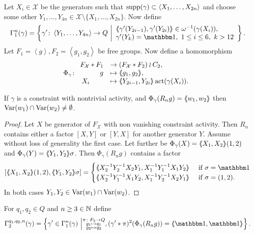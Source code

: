 \documentclass[a4paper,11pt]{amsart}
\begin{document}
Let $X_i\in\mathcal{X}$ be the generators such that
$\operatorname{{supp}}(\gamma) \subset \left<X_1,\dotsc,X_{2n}\right>$ and choose some
other
$Y_1,\dotsc,Y_{4n} \in\mathcal{X} \setminus \{X_1,\dotsc,X_{2n}\}$.
Now define
\[\Gamma_1^n(\gamma) = \left \{\gamma' 
    \colon \left< Y_1,\ldots ,Y_{4n}\right> \to Q \bigmid
    \begin{array}{l}
      \pair{\gamma'(Y_{2i-1}),\gamma'(Y_{2i})}\in \omega^{-1}(\gamma(X_i)),\ \\
      \gamma'(Y_k) = \id,\ 1\leq i\leq 6,\ k>12
    \end{array} \right\}.\]
Let $F_1=\left<g\right>,F_2=\left<g_1,g_2\right>$ be free groups. 
Now define a homomorphism  
\[\Phi_{\gamma}\colon\begin{array}{rl} F_{\mathcal{X}}*F_1 &\to (F_{\mathcal{X}}*F_2)\wr C_2,\\ g&\mapsto \langle\negthickspace\langle g_1,g_2\rangle\negthickspace\rangle,\\ X_i\qquad &\mapsto \langle\negthickspace\langle Y_{2i-1},Y_{2i}\rangle\negthickspace\rangle\operatorname{act}(\gamma(X_i)).\end{array}\]
\begin{lem}\label{lem:commonVar}
  If $\gamma$ is a constraint with nontrivial activity, and
  $\Phi_\gamma(R_ng)=\langle\negthickspace\langle w_1,w_2\rangle\negthickspace\rangle$ then
  $\textup{Var}(w_1)\cap\textup{Var}(w_2)\neq \emptyset$.
\end{lem}
\begin{proof}
  Let $X$ be generator of $F_{\mathcal{X}}$ with non vanishing
  constraint activity.  Then $R_n$ contains either a factor $[X,Y]$ or
  $[Y,X]$ for another generator $Y$.  Assume without loss of
  generality the first case. Let further be
  $\Phi_\gamma(X)=\langle\negthickspace\langle X_1,X_2\rangle\negthickspace\rangle(1,2)$ and
  $\Phi_\gamma(Y)=\langle\negthickspace\langle Y_1,Y_2\rangle\negthickspace\rangle\sigma$.  Then $\Phi_\gamma(R_n g)$
  contains a factor
  \[ [\pair{X_1,X_2}(1,2),\pair{Y_1,Y_2}\sigma] = \begin{cases}
      \pair{X_2^{-1}Y_2^{-1}X_2Y_1,X_1^{-1}Y_1^{-1}X_1Y_2} & \textup{ if } \sigma=\id \\
      \pair{X_2^{-1}Y_1^{-1}X_1Y_2,X_1^{-1}Y_2^{-1}X_2Y_1} & \textup{ if } \sigma=(1,2) . \\
    \end{cases}
  \]
  In both cases $Y_1,Y_2\in \textup{Var}(w_1)\cap \textup{Var}(w_2)$.
\end{proof}
For $q_1,q_2 \in Q$ and $n\geq3\in \mathbb{N}$ define
\[\Gamma_2^{q_1,q_2,n}(\gamma) = \left\{\gamma'\in \Gamma_1^n(\gamma) \bigmid \substack{\pi\colon F_2\to Q\\
      g_1\mapsto q_1 \\
      g_2\mapsto q_2 },
    (\gamma'*\pi)^2(\Phi_\gamma(R_ng))=\pair{\id,\id}\right\}.\]
\end{document}
